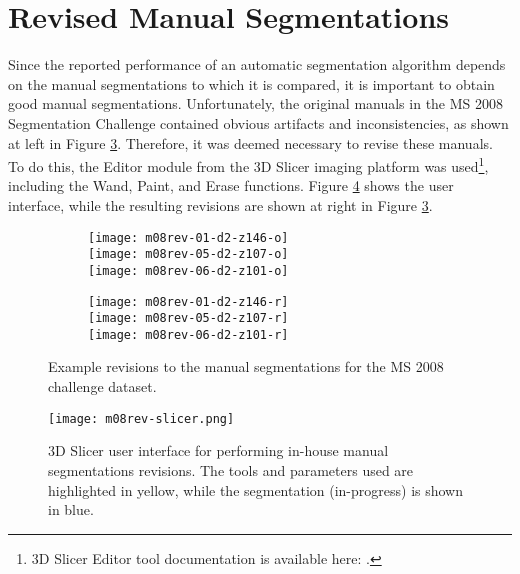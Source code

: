 \section{Revised Manual Segmentations}
Since the reported performance of an automatic segmentation algorithm depends on the manual segmentations to which it is compared, it is important to obtain good manual segmentations. Unfortunately, the original manuals in the MS 2008 Segmentation Challenge contained obvious artifacts and inconsistencies, as shown at left in Figure \ref{fig:m08-rev}. Therefore, it was deemed necessary to revise these manuals. To do this, the Editor module from the 3D Slicer imaging platform \cite{Fedorov2012} was used\footnote{3D Slicer Editor tool documentation is available here: .}, including the Wand, Paint, and Erase functions. Figure \ref{fig:m08-rev-slicer} shows the user interface, while the resulting revisions are shown at right in Figure \ref{fig:m08-rev}.
\begin{figure}
  \centering
  \begin{minipage}{6cm}
    \begin{subfigure}{\textwidth}
      \centering{}\label{fig:m08-rev-o}
      \texttt{[image: m08rev-01-d2-z146-o]}\\[0.2em]
      \texttt{[image: m08rev-05-d2-z107-o]}\\[0.2em]
      \texttt{[image: m08rev-06-d2-z101-o]}
    \end{subfigure}
  \end{minipage}
  \begin{minipage}{6cm}
    \begin{subfigure}{\textwidth}
      \centering{}\label{fig:m08-rev-r}
      \texttt{[image: m08rev-01-d2-z146-r]}\makebox[0pt][r]{\textcolor{white}{ CHB 01 }}\\[0.2em]
      \texttt{[image: m08rev-05-d2-z107-r]}\makebox[0pt][r]{\textcolor{white}{ CHB 05 }}\\[0.2em]
      \texttt{[image: m08rev-06-d2-z101-r]}\makebox[0pt][r]{\textcolor{white}{ CHB 06 }}
    \end{subfigure}
  \end{minipage}
  \caption{Example revisions to the manual segmentations for the MS 2008 challenge dataset.}
  \label{fig:m08-rev}
\end{figure}
\begin{figure}
  \centering
  \texttt{[image: m08rev-slicer.png]}
  \caption{3D Slicer user interface for performing in-house manual segmentations revisions. The tools and parameters used are highlighted in yellow, while the segmentation (in-progress) is shown in blue.}
  \label{fig:m08-rev-slicer}
\end{figure}

